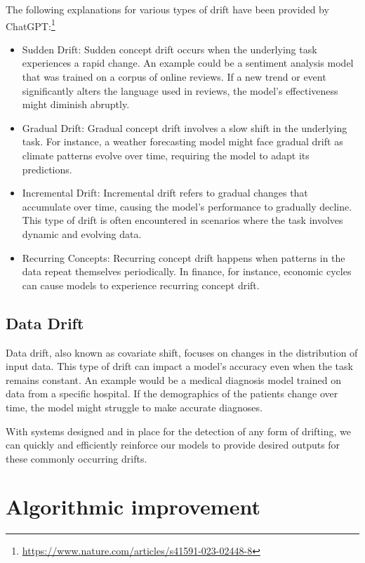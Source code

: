 \documentclass[
]{book}
\begin{document}
The following explanations for various types of drift have been provided by ChatGPT:\footnote{\url{https://www.nature.com/articles/s41591-023-02448-8}}

\begin{itemize}
\item
  Sudden Drift: Sudden concept drift occurs when the underlying task experiences a rapid change. An example could be a sentiment analysis model that was trained on a corpus of online reviews. If a new trend or event significantly alters the language used in reviews, the model's effectiveness might diminish abruptly.
\item
  Gradual Drift: Gradual concept drift involves a slow shift in the underlying task. For instance, a weather forecasting model might face gradual drift as climate patterns evolve over time, requiring the model to adapt its predictions.
\item
  Incremental Drift: Incremental drift refers to gradual changes that accumulate over time, causing the
  model's performance to gradually decline. This type of drift is often encountered in scenarios where the task involves dynamic and evolving data.
\item
  Recurring Concepts: Recurring concept drift happens when patterns in the data repeat themselves periodically. In finance, for instance, economic cycles can cause models to experience recurring concept drift.
\end{itemize}

\hypertarget{data-drift}{%
\subsection{Data Drift}\label{data-drift}}

Data drift, also known as covariate shift, focuses on changes in the distribution of input data. This type of drift can impact a model's accuracy even when the task remains constant. An example would be a medical diagnosis model trained on data from a specific hospital. If the demographics of the patients change over time, the model might struggle to make accurate diagnoses.

With systems designed and in place for the detection of any form of drifting, we can quickly and efficiently reinforce our models to provide desired outputs for these commonly occurring drifts.

\hypertarget{algorithmic-improvement}{%
\section{Algorithmic improvement}\label{algorithmic-improvement}}
\end{document}
